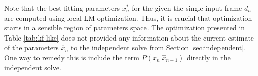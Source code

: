 Note that the best-fitting parameters $x_n^*$ for the given the single input frame $d_n$ are computed using local LM optimization. Thus, it is crucial that optimization starts in a sensible region of parameters space. The optimization presented in Table \ref{tab:kf-like} does not provided any information about the current estimate of the parameters $\hat{x}_n$ to the independent solve from Section \ref{sec:independent}. One way to remedy this is include the term $P(x_n |\hat{x}_{n - 1})$ directly in the independent solve.

\begin{table}[ht] 
\centering
\caption{Objective function of IEKF \label{tab:iekf-like}} 
\end{table}

